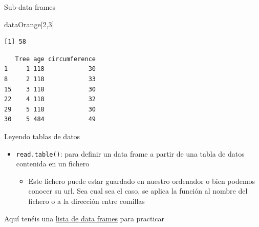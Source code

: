 \documentclass[
  ignorenonframetext,
]{beamer}
\newenvironment{Shaded}{\begin{snugshade}}{\end{snugshade}}
\newcommand{\DecValTok}[1]{\textcolor[rgb]{0.00,0.00,0.81}{#1}}
\newcommand{\NormalTok}[1]{#1}
\newcommand{\SpecialCharTok}[1]{\textcolor[rgb]{0.81,0.36,0.00}{\textbf{#1}}}
\providecommand{\tightlist}{%
  \setlength{\itemsep}{0pt}\setlength{\parskip}{0pt}}
\begin{document}
\begin{frame}[fragile]{Sub-data frames}
\label{sub-data-frames-2}
\begin{Shaded}
\begin{Highlighting}[]
\NormalTok{dataOrange[}\DecValTok{2}\NormalTok{,}\DecValTok{3}\NormalTok{]}
\end{Highlighting}
\end{Shaded}

\begin{verbatim}
[1] 58
\end{verbatim}

\begin{Shaded}
\end{Shaded}

\begin{verbatim}
   Tree age circumference
1     1 118            30
8     2 118            33
15    3 118            30
22    4 118            32
29    5 118            30
30    5 484            49
\end{verbatim}
\end{frame}

\begin{frame}[fragile]{Leyendo tablas de datos}
\label{leyendo-tablas-de-datos}
\begin{itemize}
\tightlist
\item
  \texttt{read.table()}: para definir un data frame a partir de una
  tabla de datos contenida en un fichero

  \begin{itemize}
  \tightlist
  \item
    Este fichero puede estar guardado en nuestro ordenador o bien
    podemos conocer su url. Sea cual sea el caso, se aplica la función
    al nombre del fichero o a la dirección entre comillas
  \end{itemize}
\end{itemize}

Aquí tenéis una \href{http://aprender.uib.es/}{lista de data frames}
para practicar
\end{frame}
\end{document}
